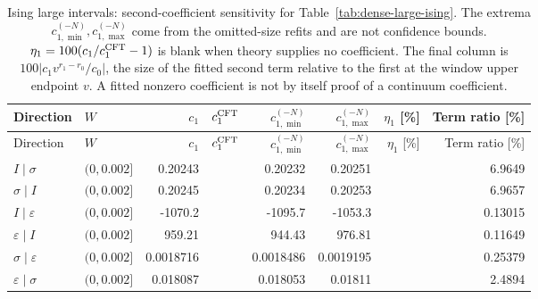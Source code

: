 \begingroup\setlength{\tabcolsep}{3pt}
\begin{longtable}{llrrrrrr}
\caption{Ising large intervals: second-coefficient sensitivity for Table~\ref{tab:dense-large-ising}. The extrema $c_{1,\min}^{(-N)},c_{1,\max}^{(-N)}$ come from the omitted-size refits and are not confidence bounds. $\eta_1=100(c_1/c_1^{\rm CFT}-1)$ is blank when theory supplies no coefficient. The final column is $100|c_1v^{r_1-r_0}/c_0|$, the size of the fitted second term relative to the first at the window upper endpoint $v$. A fitted nonzero coefficient is not by itself proof of a continuum coefficient.}
\label{tab:dense-large-ising-second}\\\toprule
Direction & $W$ & $c_1$ & $c_1^{\rm CFT}$ & $c_{1,\min}^{(-N)}$ & $c_{1,\max}^{(-N)}$ & $\eta_1$ [\%] & Term ratio [\%]\\\midrule
\endfirsthead
\toprule
Direction & $W$ & $c_1$ & $c_1^{\rm CFT}$ & $c_{1,\min}^{(-N)}$ & $c_{1,\max}^{(-N)}$ & $\eta_1$ [\%] & Term ratio [\%]\\\midrule
\endhead
\bottomrule\endfoot
$I\mid \sigma$ & $(0,0.002]$ & 0.20243 &  & 0.20232 & 0.20251 &  & 6.9649\\
$\sigma\mid I$ & $(0,0.002]$ & 0.20245 &  & 0.20234 & 0.20253 &  & 6.9657\\
$I\mid \varepsilon$ & $(0,0.002]$ & -1070.2 &  & -1095.7 & -1053.3 &  & 0.13015\\
$\varepsilon\mid I$ & $(0,0.002]$ & 959.21 &  & 944.43 & 976.81 &  & 0.11649\\
$\sigma\mid \varepsilon$ & $(0,0.002]$ & 0.0018716 &  & 0.0018486 & 0.0019195 &  & 0.25379\\
$\varepsilon\mid \sigma$ & $(0,0.002]$ & 0.018087 &  & 0.018053 & 0.01811 &  & 2.4894\\
\end{longtable}
\endgroup
